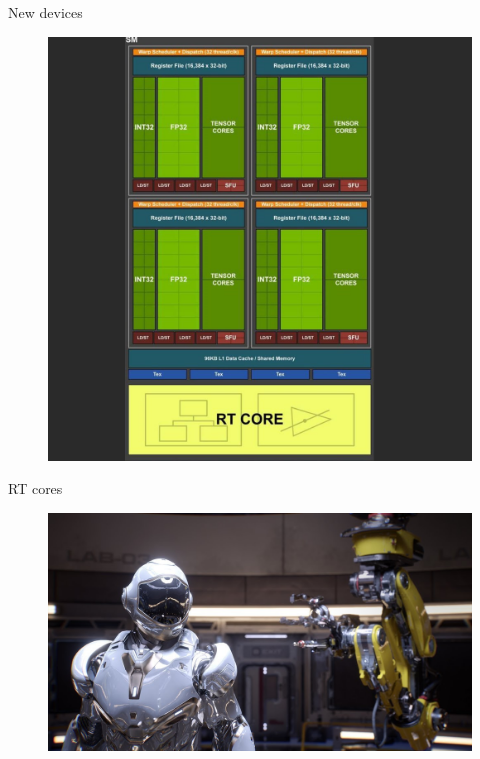 \documentclass{beamer}
\begin{document}
\begin{frame}{New devices}
	\begin{figure}
		\includegraphics[scale=0.3]{figures/TU102_SM.png}
	\end{figure}
\end{frame}

\begin{frame}{RT cores}
	\begin{figure}
		\includegraphics[scale=0.25]{figures/sol.jpg}
	\end{figure}
\end{frame}
\end{document}
